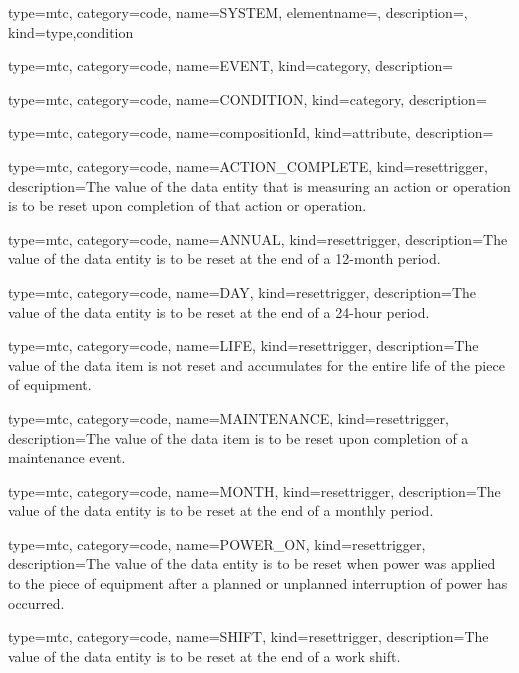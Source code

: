 {
  type=mtc,
  category=code,
  name={SYSTEM},
  elementname=,
  description={},
  kind={type,condition}
}


{
  type=mtc,
  category=code,
  name={EVENT},
  kind={category},
  description={}
}


{
  type=mtc,
  category=code,
  name={CONDITION},
  kind={category},
  description={}
}


{
  type=mtc,
  category=code,
  name={compositionId},
  kind={attribute},
  description={}
}


{
  type=mtc,
  category=code,
  name={ACTION\_COMPLETE},
  kind={resettrigger},
  description={The value of the \gls{data entity} that is measuring an action or operation is to be reset upon completion of that action or operation.}
}


{
  type=mtc,
  category=code,
  name={ANNUAL},
  kind={resettrigger},
  description={The value of the \gls{data entity} is to be reset at the end of a 12-month period.}
}


{
  type=mtc,
  category=code,
  name={DAY},
  kind={resettrigger},
  description={The value of the \gls{data entity} is to be reset at the end of a 24-hour period.}
}


{
  type=mtc,
  category=code,
  name={LIFE},
  kind={resettrigger},
  description={The value of the data item is not reset and accumulates for the entire life of the piece of equipment.}
}


{
  type=mtc,
  category=code,
  name={MAINTENANCE},
  kind={resettrigger},
  description={The value of the data item is to be reset upon completion of a maintenance event.}
}


{
  type=mtc,
  category=code,
  name={MONTH},
  kind={resettrigger},
  description={The value of the \gls{data entity} is to be reset at the end of a monthly period.}
}


{
  type=mtc,
  category=code,
  name={POWER\_ON},
  kind={resettrigger},
  description={The value of the \gls{data entity} is to be reset when power was applied to the piece of equipment after a planned or unplanned interruption of power has occurred.}
}


{
  type=mtc,
  category=code,
  name={SHIFT},
  kind={resettrigger},
  description={The value of the \gls{data entity} is to be reset at the end of a work shift.}
}


